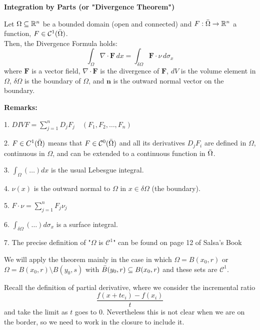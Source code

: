\begin{ThBox}
    \begin{Th}
        \textbf{Integration by Parts (or "Divergence Theorem")}

Let \( \Omega \subseteq \mathbb{R}^n \) be a bounded domain (open and connected) and $F:\Bar{\Omega} \rightarrow \mathbb{R}^n$ a function, $F \in \mathcal{C}^1(\Bar{\Omega})$. \\
Then, the Divergence Formula holds:
\begin{equation}
\label{DF}
    \int_{\Omega} \nabla \cdot \mathbf{F} \, dx = \int_{\delta \Omega} \mathbf{F} \cdot \nu \, d\sigma_x
\end{equation}
where \( \mathbf{F} \) is a vector field, \( \nabla \cdot \mathbf{F} \) is the divergence of \( \mathbf{F} \), \( dV \) is the volume element in \( \Omega \), \( \delta\Omega \) is the boundary of \( \Omega \), and \( \mathbf{n} \) is the outward normal vector on the boundary.
    \end{Th}
\end{ThBox}


\textbf{Remarks:}

1. \( DIV F = \sum_{j= 1}^n D_j F_j \quad (F_1, F_2, \ldots, F_n) \)

2. \( F \in C^1(\Bar{\Omega}) \) means that \( F \in \mathcal{C}^0(\Bar{\Omega}) \) and all its derivatives \( D_j F_i \) are defined in \( \Omega \), continuous in $\Omega$, and can be extended to a continuous function in $\Bar{\Omega}$.

3. \( \int_\Omega (\ldots) dx \) is the usual Lebesgue integral.

4. \( \nu(x) \) is the outward normal to $\Omega$ in $x \in \delta \Omega$ (the boundary). 

5. $F \cdot \nu = \sum_{j=1}^n F_j \nu_j$

6. $\int_{\delta \Omega}  (\ldots) d \sigma_x$ is a surface integral. 

7. The precise definition of "$\Omega$ is $\mathcal{C}^1$" can be found on page 12 of Salsa's Book

We will apply the theorem mainly in the case in which $\Omega = B(x_0, r)$ or $\Omega = B(x_0,r) \setminus B(y_0,s)$ with $\Bar{B}(y_0,r) \subseteq B(x_0,r)$ and these sets are \( \mathcal{C}^1 \).


\begin{remark}
    Recall the definition of partial derivative, where we consider the incremental ratio
    \begin{equation*}
        \frac{f(x+te_i) - f(x_i)}{t}
    \end{equation*}
    and take the limit as $t$ goes to $0$. Nevertheless this is not clear when we are on the border, so we need to work in the closure to include it. 
\end{remark}



